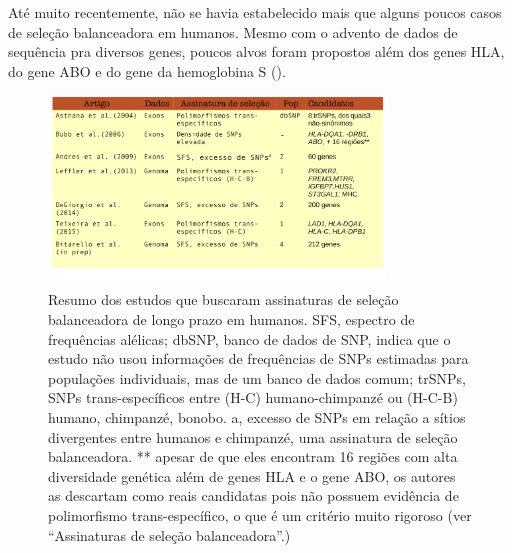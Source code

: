 \begin{refsection}

Até muito recentemente, não se havia estabelecido mais que alguns poucos casos de seleção balanceadora em humanos. Mesmo com o advento de dados de sequência pra diversos genes, poucos alvos foram propostos além dos genes HLA, do gene ABO e do gene da hemoglobina S (\cite{Allison1954,Kummerfeld2005,Bubb2006,Hughes1988,Segurel2013,}).

\begin{figure}[ht]
\centering
\includegraphics[width=0.8\textwidth]{chap1_folder/Figures/all_scans_v2.png}
\caption{Resumo dos estudos que buscaram assinaturas de seleção balanceadora de longo prazo em humanos. SFS, espectro de frequências alélicas; dbSNP, banco de dados de SNP, indica que o estudo não usou informações de frequências de SNPs estimadas para populações individuais, mas de um banco de dados comum; trSNPs, SNPs trans-específicos entre (H-C) humano-chimpanzé ou (H-C-B) humano, chimpanzé, bonobo. a, excesso de SNPs em relação a sítios divergentes entre humanos e chimpanzé, uma assinatura de seleção balanceadora. ** apesar de que eles encontram 16 regiões com alta diversidade genética além de genes HLA e o gene ABO, os autores as descartam como reais candidatas pois não possuem evidência de polimorfismo trans-específico, o que é um critério muito rigoroso (ver \enquote{Assinaturas de seleção balanceadora}.)}

\end{figure}
\end{refsection}
